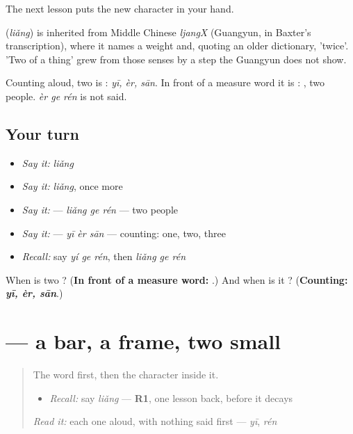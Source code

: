 The next lesson puts the new character in your hand.

\begin{cousinweb}
\textbf{} (\emph{liǎng}) is inherited from Middle Chinese \emph{ljangX} (Guangyun, in Baxter's transcription), where it names a weight and, quoting an older dictionary, 'twice'. 'Two of a thing' grew from those senses by a step the Guangyun does not show.
\end{cousinweb}

\begin{grammarlens}[title={What you've built}]
Counting aloud, two is : \emph{yī, èr, sān}. In front of a measure word it is : , two people. \emph{èr ge rén} is not said.
\end{grammarlens}

\subsection*{Your turn}
\begin{itemize}
\raggedright
  \item \emph{Say it:} \emph{liǎng}
  \item \emph{Say it:} \emph{liǎng}, once more
  \item \emph{Say it:}  — \emph{liǎng ge rén} — two people
  \item \emph{Say it:}    — \emph{yī èr sān} — counting: one, two, three
  \item \emph{Recall:} say \emph{yí ge rén}, then \emph{liǎng ge rén}
\end{itemize}

\begin{tcolorbox}[breakable,colback=teal!4,colframe=teal!35!black,title={Before you move on}]
When is two ? (\textbf{In front of a measure word: }.) And when is it ? (\textbf{Counting: \emph{yī, èr, sān}}.)
\end{tcolorbox}
\section[\texorpdfstring{\zh{两} (liǎng)}{两 (liǎng)}]{ — a bar, a frame, two small }

\label{lesson:ZH-W88-liang}



\begin{quote}
The word first, then the character inside it.

\begin{itemize}
\raggedright
  \item \emph{Recall:} say \emph{liǎng} — \textbf{R1}, one lesson back, before it decays
\end{itemize}

\begin{quote}
 
\end{quote}

\emph{Read it:} each one aloud, with nothing said first — \emph{yī}, \emph{rén}
\end{quote}

